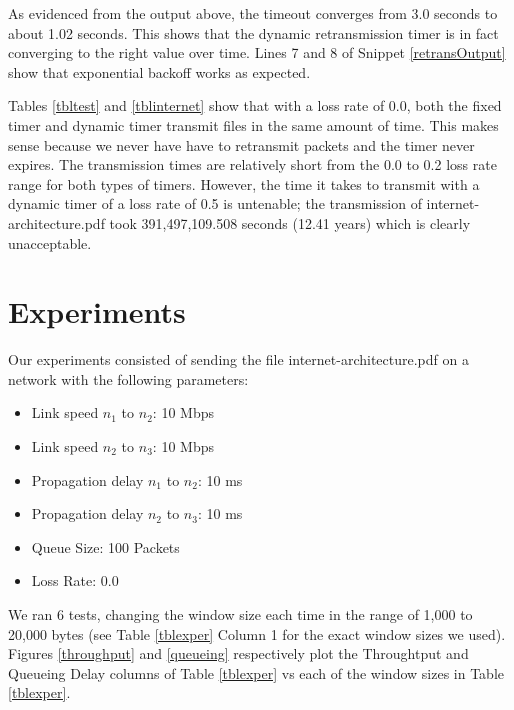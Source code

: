 \documentclass[11pt]{article}
\begin{document}
As evidenced from the output above, the timeout converges from 3.0 seconds to about 1.02 seconds. This shows that the dynamic retransmission timer is in fact converging to the right value over time. Lines 7 and 8 of Snippet \ref{retransOutput} show that exponential backoff works as expected.

Tables \ref{tbltest} and \ref{tblinternet} show that with a loss rate of 0.0, both the fixed timer and dynamic timer transmit files in the same amount of time. This makes sense because we never have have to retransmit packets and the timer never expires. The transmission times are relatively short from the 0.0 to 0.2 loss rate range for both types of timers. However, the time it takes to transmit with a dynamic timer of a loss rate of 0.5 is untenable; the transmission of internet-architecture.pdf took 391,497,109.508 seconds (12.41 years) which is clearly unacceptable.

\section{Experiments}

Our experiments consisted of sending the file internet-architecture.pdf on a network with the following parameters:

\begin{itemize}
\item Link speed $n_1$ to $n_2$: 10 Mbps
\item Link speed $n_2$ to $n_3$: 10 Mbps
\item Propagation delay $n_1$ to $n_2$: 10 ms
\item Propagation delay $n_2$ to $n_3$: 10 ms
\item Queue Size: 100 Packets
\item Loss Rate: 0.0
\end{itemize}

We ran 6 tests, changing the window size each time in the range of 1,000 to 20,000 bytes (see Table \ref{tblexper} Column 1 for the exact window sizes we used). Figures \ref{throughput} and \ref{queueing} respectively plot the Throughtput and Queueing Delay columns of Table \ref{tblexper} vs each of the window sizes in Table \ref{tblexper}.
\end{document}
